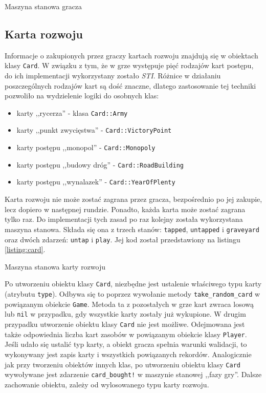 \documentclass[11pt,twoside]{report}
\begin{document}
\begin{listing}
  
  \caption{Maszyna stanowa gracza}
  \label{listing:player}
\end{listing}

\subsection{Karta rozwoju}
Informacje o zakupionych przez graczy kartach rozwoju znajdują się w
obiektach klasy \texttt{Card}. W związku z tym, że w grze występuje
pięć rodzajów kart postępu, do ich implementacji wykorzystany zostało
\emph{STI}. Różnice w działaniu poszczególnych rodzajów kart są dość
znaczne, dlatego zastosowanie tej techniki pozwoliło na wydzielenie
logiki do osobnych klas:

\begin{itemize}
\item karty ,,rycerza'' - klasa \texttt{Card::Army}
\item karty ,,punkt zwycięstwa'' - \texttt{Card::VictoryPoint}
\item karty postępu ,,monopol'' - \texttt{Card::Monopoly}
\item karty postępu ,,budowy dróg'' - \texttt{Card::RoadBuilding}
\item karty postępu ,,wynalazek'' - \texttt{Card::YearOfPlenty}
\end{itemize}

Karta rozwoju nie może zostać zagrana przez gracza, bezpośrednio po
jej zakupie, lecz dopiero w następnej rundzie. Ponadto, każda karta
może zostać zagrana tylko raz. Do implementacji tych zasad po raz
kolejny została wykorzystana maszyna stanowa. Składa się ona z trzech
stanów: \texttt{tapped}, \texttt{untapped} i \texttt{graveyard} oraz
dwóch zdarzeń: \texttt{untap} i \texttt{play}. Jej kod został
przedstawiony na listingu \ref{listing:card}.


\begin{listing}
  
  \caption{Maszyna stanowa karty rozwoju}
  \label{listing:card}
\end{listing}

Po utworzeniu obiektu klasy \texttt{Card}, niezbędne jest ustalenie
właściwego typu karty (atrybutu \texttt{type}). Odbywa się to poprzez
wywołanie metody \texttt{take\_random\_card} w powiązanym obiekcie
\texttt{Game}. Metoda ta z pozostałych w grze kart zwraca losową lub
\texttt{nil} w przypadku, gdy wszystkie karty zostały już wykupione. W
drugim przypadku utworzenie obiektu klasy \texttt{Card} nie jest
możliwe. Odejmowana jest także odpowiednia liczba kart zasobów w
powiązanym obiekcie klasy \texttt{Player}. Jeśli udało się ustalić typ
karty, a obiekt gracza spełnia warunki walidacji, to wykonywany jest
zapis karty i wszystkich powiązanych rekordów. Analogicznie jak przy
tworzeniu obiektów innych klas, po utworzeniu obiektu klasy
\texttt{Card} wywoływane jest zdarzenie \texttt{card\_bought!} w
maszynie stanowej ,,fazy gry''. Dalsze zachowanie obiektu, zależy od
wylosowanego typu karty rozwoju.
\end{document}
